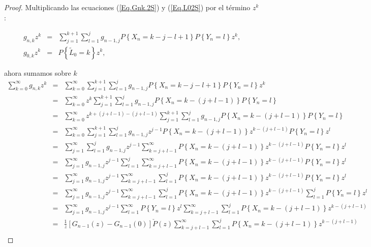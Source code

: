 \documentclass{article}
\numberwithin{equation}{section}
\begin{document}
\begin{proof}

Multiplicando las ecuaciones (\ref{Eq.Gnk.2S}) y (\ref{Eq.L02S})
por el t\'ermino $z^{k}$:

\begin{eqnarray*}
g_{n,k}z^{k}&=&\sum_{j=1}^{k+1}\sum_{l=1}^{j}g_{n-1,j}P\left\{X_{n}=k-j-l+1\right\}P\left\{Y_{n}=l\right\}z^{k},\\
g_{0,k}z^{k}&=&P\left\{\tilde{L}_{0}=k\right\}z^{k},
\end{eqnarray*}

ahora sumamos sobre $k$
\begin{eqnarray*}
\sum_{k=0}^{\infty}g_{n,k}z^{k}&=&\sum_{k=0}^{\infty}\sum_{j=1}^{k+1}\sum_{l=1}^{j}g_{n-1,j}P\left\{X_{n}=k-j-l+1\right\}P\left\{Y_{n}=l\right\}z^{k}\\
&=&\sum_{k=0}^{\infty}z^{k}\sum_{j=1}^{k+1}\sum_{l=1}^{j}g_{n-1,j}P\left\{X_{n}=k-\left(j+l-1\right)\right\}P\left\{Y_{n}=l\right\}\\
&=&\sum_{k=0}^{\infty}z^{k+\left(j+l-1\right)-\left(j+l-1\right)}\sum_{j=1}^{k+1}\sum_{l=1}^{j}g_{n-1,j}P\left\{X_{n}=k-\left(j+l-1\right)\right\}P\left\{Y_{n}=l\right\}\\
&=&\sum_{k=0}^{\infty}\sum_{j=1}^{k+1}\sum_{l=1}^{j}g_{n-1,j}z^{j-1}P\left\{X_{n}=k-\left(j+l-1\right)\right\}z^{k-\left(j+l-1\right)}P\left\{Y_{n}=l\right\}z^{l}\\
&=&\sum_{j=1}^{\infty}\sum_{l=1}^{j}g_{n-1,j}z^{j-1}\sum_{k=j+l-1}^{\infty}P\left\{X_{n}=k-\left(j+l-1\right)\right\}z^{k-\left(j+l-1\right)}P\left\{Y_{n}=l\right\}z^{l}\\
&=&\sum_{j=1}^{\infty}g_{n-1,j}z^{j-1}\sum_{l=1}^{j}\sum_{k=j+l-1}^{\infty}P\left\{X_{n}=k-\left(j+l-1\right)\right\}z^{k-\left(j+l-1\right)}P\left\{Y_{n}=l\right\}z^{l}\\
&=&\sum_{j=1}^{\infty}g_{n-1,j}z^{j-1}\sum_{k=j+l-1}^{\infty}\sum_{l=1}^{j}P\left\{X_{n}=k-\left(j+l-1\right)\right\}z^{k-\left(j+l-1\right)}P\left\{Y_{n}=l\right\}z^{l}\\
&=&\sum_{j=1}^{\infty}g_{n-1,j}z^{j-1}\sum_{k=j+l-1}^{\infty}\sum_{l=1}^{j}P\left\{X_{n}=k-\left(j+l-1\right)\right\}z^{k-\left(j+l-1\right)}\sum_{l=1}^{j}P\left\{Y_{n}=l\right\}z^{l}\\
&=&\sum_{j=1}^{\infty}g_{n-1,j}z^{j-1}\sum_{l=1}^{\infty}P\left\{Y_{n}=l\right\}z^{l}\sum_{k=j+l-1}^{\infty}\sum_{l=1}^{j}P\left\{X_{n}=k-\left(j+l-1\right)\right\}z^{k-\left(j+l-1\right)}\\
&=&\frac{1}{z}\left[G_{n-1}\left(z\right)-G_{n-1}\left(0\right)\right]\check{P}\left(z\right)\sum_{k=j+l-1}^{\infty}\sum_{l=1}^{j}P\left\{X_{n}=k-\left(j+l-1\right)\right\}z^{k-\left(j+l-1\right)}\\

\end{eqnarray*}
\end{proof}
\end{document}
